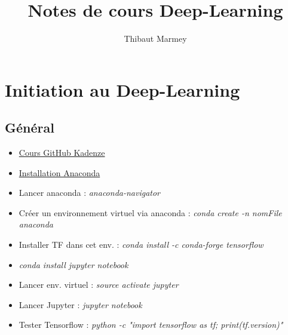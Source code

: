 \documentclass[12pt,a4paper]{article}
\author{Thibaut Marmey}
\title{Notes de cours Deep-Learning}
\begin{document}
	\maketitle

\begin{normalsize}
\tableofcontents
\end{normalsize}

\section{Initiation au Deep-Learning}
\subsection{Général}
\begin{itemize}
\item \href{https://github.com/pkmital/CADL}{Cours GitHub Kadenze}
\item \href{http://docs.continuum.io/anaconda/install/linux/}{Installation Anaconda}
\item Lancer anaconda : \textit{anaconda-navigator}
\item Créer un environnement virtuel via anaconda : \textit{conda create -n nomFile anaconda}
\item Installer TF dans cet env. : \textit{conda install -c conda-forge tensorflow}
\item \textit{conda install jupyter notebook}
\item Lancer env. virtuel : \textit{source activate jupyter}
\item Lancer Jupyter : \textit{jupyter notebook}
\item Tester Tensorflow : \textit{python -c "import tensorflow as tf; print(tf.\textunderscore \textunderscore version\textunderscore \textunderscore)"}

\end{itemize}
\end{document}
